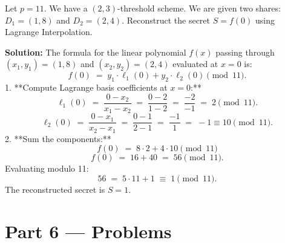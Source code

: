 \documentclass[12pt, a4paper]{book}
\begin{document}
\begin{problembox}
\begin{enumerate}[label=\textbf{E\arabic*.}]
        Let $p = 11$. We have a $(2, 3)$-threshold scheme.
        We are given two shares: $D_1 = (1, 8)$ and $D_2 = (2, 4)$.
        Reconstruct the secret $S = f(0)$ using Lagrange Interpolation.
        
        \textbf{Solution:}
        The formula for the linear polynomial $f(x)$ passing through $(x_1, y_1) = (1, 8)$ and $(x_2, y_2) = (2, 4)$ evaluated at $x = 0$ is:
        \[
          f(0) \;=\; y_1 \cdot \ell_1(0) + y_2 \cdot \ell_2(0) \pmod{11}.
        \]
        1. **Compute Lagrange basis coefficients at $x = 0$:**
           \[
             \ell_1(0) \;=\; \frac{0 - x_2}{x_1 - x_2} \;=\; \frac{0 - 2}{1 - 2} \;=\; \frac{-2}{-1} \;=\; 2 \pmod{11}.
           \]
           \[
             \ell_2(0) \;=\; \frac{0 - x_1}{x_2 - x_1} \;=\; \frac{0 - 1}{2 - 1} \;=\; \frac{-1}{1} \;=\; -1 \equiv 10 \pmod{11}.
           \]
        2. **Sum the components:**
           \[
             f(0) \;=\; 8 \cdot 2 + 4 \cdot 10 \pmod{11}
           \]
           \[
             f(0) \;=\; 16 + 40 \;=\; 56 \pmod{11}.
           \]
           Evaluating modulo 11:
           \[
             56 \;=\; 5 \cdot 11 + 1 \;\equiv\; 1 \pmod{11}.
           \]
        The reconstructed secret is $S = 1$.
\end{enumerate}
\end{problembox}

\newpage

\section{Part 6 --- Problems}
\end{document}
